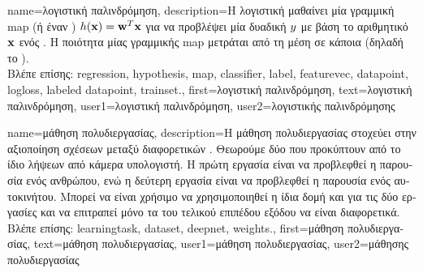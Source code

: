 {name={\foreignlanguage{greek}{λογιστική παλινδρόμηση}}, 
	description={\foreignlanguage{greek}{Η λογιστική} 
		 \foreignlanguage{greek}{μαθαίνει μία γραμμική} \gls{map}  (\foreignlanguage{greek}{ή έναν}  
		) $h({\bf x}) = {\bf w}^{T} {\bf x}$ 
		\foreignlanguage{greek}{για να προβλέψει μία δυαδική}  $y$ \foreignlanguage{greek}{με βάση 
		το αριθμητικό}  ${\bf x}$ \foreignlanguage{greek}{ενός} 
		. \foreignlanguage{greek}{Η ποιότητα μίας γραμμικής} \gls{map}  
		\foreignlanguage{greek}{μετράται από τη μέση}  \foreignlanguage{greek}{σε κάποια}
		 (\foreignlanguage{greek}{δηλαδή το} ).\\
		\foreignlanguage{greek}{Βλέπε επίσης:} \gls{regression}, \gls{hypothesis}, \gls{map}, \gls{classifier}, \gls{label}, \gls{featurevec}, 
		\gls{datapoint}, \gls{logloss}, \gls{labeled datapoint}, \gls{trainset}.},
	first={\foreignlanguage{greek}{λογιστική παλινδρόμηση}},
	text={\foreignlanguage{greek}{λογιστική παλινδρόμηση}},
	user1={\foreignlanguage{greek}{λογιστική παλινδρόμηση}}, %
	user2={\foreignlanguage{greek}{λογιστικής παλινδρόμησης}} %
}

{name={\foreignlanguage{greek}{μάθηση πολυδιεργασίας}},
	description={\foreignlanguage{greek}{Η μάθηση πολυδιεργασίας στοχεύει στην αξιοποίηση} 
		\foreignlanguage{greek}{σχέσεων μεταξύ διαφορετικών} . \foreignlanguage{greek}{Θεωρούμε δύο} 
		 \foreignlanguage{greek}{που προκύπτουν από το ίδιο}  
	 	 \foreignlanguage{greek}{λήψεων από κάμερα υπολογιστή. Η πρώτη εργασία είναι να προβλεφθεί η 
		παρουσία ενός ανθρώπου, ενώ η δεύτερη εργασία είναι να προβλεφθεί η παρουσία ενός αυτοκινήτου. 
	 	Μπορεί να είναι χρήσιμο να χρησιμοποιηθεί η ίδια δομή}  \foreignlanguage{greek}{και για τις δύο 
		εργασίες και να επιτραπεί μόνο τα}  \foreignlanguage{greek}{του τελικού επιπέδου εξόδου να είναι διαφορετικά.} \\
	 	\foreignlanguage{greek}{Βλέπε επίσης:} \gls{learningtask}, \gls{dataset}, \gls{deepnet}, \gls{weights}.},
	first={\foreignlanguage{greek}{μάθηση πολυδιεργασίας}},
	text={\foreignlanguage{greek}{μάθηση πολυδιεργασίας}},
	user1={\foreignlanguage{greek}{μάθηση πολυδιεργασίας}}, %
	user2={\foreignlanguage{greek}{μάθησης πολυδιεργασίας}} %
}

